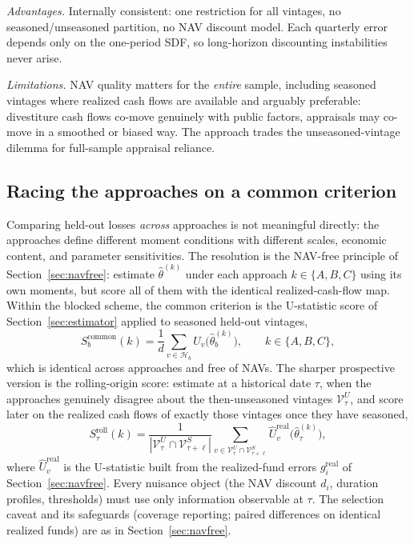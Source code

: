 \documentclass[11pt]{article}
\begin{document}
\emph{Advantages.} Internally consistent: one restriction for all vintages, no seasoned/unseasoned partition, no NAV discount model. Each quarterly error depends only on the one-period SDF, so long-horizon discounting instabilities never arise.

\emph{Limitations.} NAV quality matters for the \emph{entire} sample, including seasoned vintages where realized cash flows are available and arguably preferable: divestiture cash flows co-move genuinely with public factors, appraisals may co-move in a smoothed or biased way. The approach trades the unseasoned-vintage dilemma for full-sample appraisal reliance.

\subsection{Racing the approaches on a common criterion}
\label{app:horse_race}

Comparing held-out losses \emph{across} approaches is not meaningful directly: the approaches define different moment conditions with different scales, economic content, and parameter sensitivities. The resolution is the NAV-free principle of Section~\ref{sec:navfree}: estimate \(\hat\theta^{(k)}\) under each approach \(k\in\{A,B,C\}\) using its own moments, but score all of them with the identical realized-cash-flow map. Within the blocked scheme, the common criterion is the U-statistic score of Section~\ref{sec:estimator} applied to seasoned held-out vintages,
\[
S_b^{\mathrm{common}}(k)
=
\frac{1}{d}\sum_{v\in\mathcal H_b}\widehat U_v\bigl(\hat\theta_b^{(k)}\bigr),
\qquad k\in\{A,B,C\},
\]
which is identical across approaches and free of NAVs. The sharper prospective version is the rolling-origin score: estimate at a historical date \(\tau\), when the approaches genuinely disagree about the then-unseasoned vintages \(\mathcal V^U_\tau\), and score later on the realized cash flows of exactly those vintages once they have seasoned,
\[
S_{\tau}^{\mathrm{roll}}(k)
=
\frac{1}{|\mathcal V_{\tau}^{U}\cap \mathcal V_{\tau+\ell}^{S}|}
\sum_{v\in\mathcal V_{\tau}^{U}\cap \mathcal V_{\tau+\ell}^{S}}
\widehat U_v^{\mathrm{real}}\bigl(\hat\theta_{\tau}^{(k)}\bigr),
\]
where \(\widehat U_v^{\mathrm{real}}\) is the U-statistic built from the realized-fund errors \(g_i^{\mathrm{real}}\) of Section~\ref{sec:navfree}. Every nuisance object (the NAV discount \(d_i\), duration profiles, thresholds) must use only information observable at \(\tau\). The selection caveat and its safeguards (coverage reporting; paired differences on identical realized funds) are as in Section~\ref{sec:navfree}.
\end{document}
